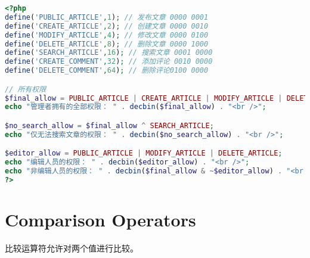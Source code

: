 \begin{lstlisting}[language=PHP]
<?php
define('PUBLIC_ARTICLE',1); // 发布文章 0000 0001
define('CREATE_ARTICLE',2); // 创建文章 0000 0010
define('MODIFY_ARTICLE',4); // 修改文章 0000 0100
define('DELETE_ARTICLE',8); // 删除文章 0000 1000
define('SEARCH_ARTICLE',16); // 搜索文章 0001 0000
define('CREATE_COMMENT',32); // 添加评论 0010 0000
define('DELETE_COMMENT',64); // 删除评论0100 0000

// 所有权限
$final_allow = PUBLIC_ARTICLE | CREATE_ARTICLE | MODIFY_ARTICLE | DELETE_ARTICLE | SEARCH_ARTICLE | CREATE_COMMENT | DELETE_COMMENT;
echo "管理者拥有的全部权限： " . decbin($final_allow) . "<br />";

$no_search_allow = $final_allow ^ SEARCH_ARTICLE;
echo "仅无法搜索文章的权限： " . decbin($no_search_allow) . "<br />";

$editor_allow = PUBLIC_ARTICLE | MODIFY_ARTICLE | DELETE_ARTICLE;
echo "编辑人员的权限： " . decbin($editor_allow) . "<br />";
echo "非编辑人员的权限： " . decbin($final_allow & ~$editor_allow) . "<br />";
?>
\end{lstlisting}



\section{Comparison Operators}

比较运算符允许对两个值进行比较。

